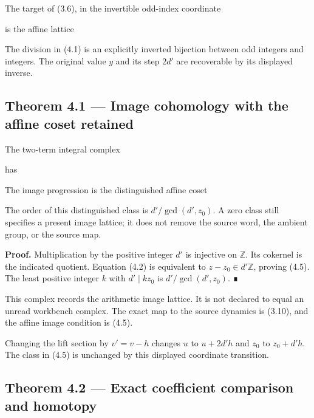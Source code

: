 The target of (3.6), in the invertible odd-index coordinate


is the affine lattice


The division in (4.1) is an explicitly inverted bijection between odd
integers and integers. The original value \(y\) and its step \(2d'\) are
recoverable by its displayed inverse.

\subsection{Theorem 4.1 --- Image cohomology with the affine coset
retained}

The two-term integral complex


has


The image progression is the distinguished affine coset


The order of this distinguished class is \(d'/\gcd(d',z_0)\). A zero
class still specifies a present image lattice; it does not remove the
source word, the ambient group, or the source map.

\textbf{Proof.} Multiplication by the positive integer \(d'\) is
injective on \(\mathbb Z\). Its cokernel is the indicated quotient.
Equation (4.2) is equivalent to \(z-z_0\in d'\mathbb Z\), proving (4.5).
The least positive integer \(k\) with \(d'\mid kz_0\) is
\(d'/\gcd(d',z_0)\). ∎

This complex records the arithmetic image lattice. It is not declared to
equal an unread workbench complex. The exact map to the source dynamics
is (3.10), and the affine image condition is (4.5).

Changing the lift section by \(v'=v-h\) changes \(u\) to \(u+2d'h\) and
\(z_0\) to \(z_0+d'h\). The class in (4.5) is unchanged by this
displayed coordinate transition.

\subsection{Theorem 4.2 --- Exact coefficient comparison and homotopy}

